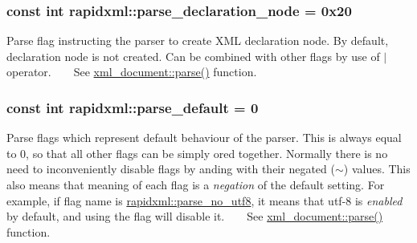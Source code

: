 \subsubsection[{parse\+\_\+declaration\+\_\+node}]{\setlength{\rightskip}{0pt plus 5cm}const int rapidxml\+::parse\+\_\+declaration\+\_\+node = 0x20}\label{namespacerapidxml_a999d782659513f8015ea4236e3204c42}
Parse flag instructing the parser to create X\+M\+L declaration node. By default, declaration node is not created. Can be combined with other flags by use of $\vert$ operator. ~\newline
~\newline
 See \hyperlink{classrapidxml_1_1xml__document_ac6e73ff9ac323bf5a370c38feb03a6b1}{xml\+\_\+document\+::parse()} function. \hypertarget{namespacerapidxml_acf4edf952f59eb1b6124ea37ad7da3ab}{}
\subsubsection[{parse\+\_\+default}]{\setlength{\rightskip}{0pt plus 5cm}const int rapidxml\+::parse\+\_\+default = 0}\label{namespacerapidxml_acf4edf952f59eb1b6124ea37ad7da3ab}
Parse flags which represent default behaviour of the parser. This is always equal to 0, so that all other flags can be simply ored together. Normally there is no need to inconveniently disable flags by anding with their negated ($\sim$) values. This also means that meaning of each flag is a {\itshape negation} of the default setting. For example, if flag name is \hyperlink{namespacerapidxml_a22d4aefaceb00d7afabfef7107b108da}{rapidxml\+::parse\+\_\+no\+\_\+utf8}, it means that utf-\/8 is {\itshape enabled} by default, and using the flag will disable it. ~\newline
~\newline
 See \hyperlink{classrapidxml_1_1xml__document_ac6e73ff9ac323bf5a370c38feb03a6b1}{xml\+\_\+document\+::parse()} function. \hypertarget{namespacerapidxml_a41002b49780a90a0bbcc28ce8b895fe4}{}
